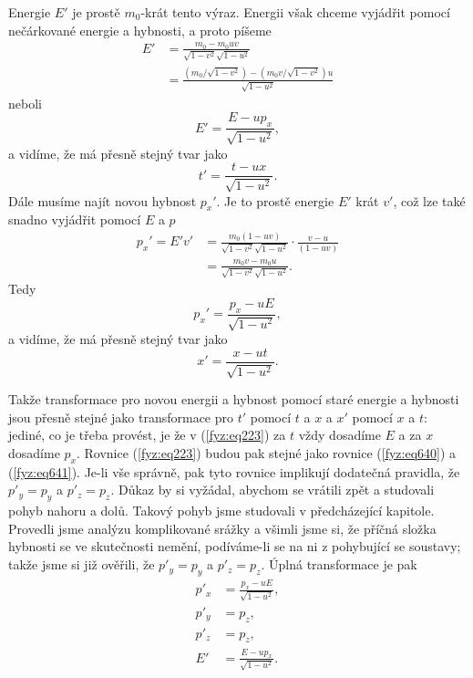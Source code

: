     Energie \(E'\) je prostě \(m_0\)-krát tento výraz. Energii však chceme vyjádřit pomocí
    nečárkované energie a hybnosti, a proto píšeme
    \begin{align*}
      E' &= \frac{m_0−m_0uv}{\sqrt{1−v^2}\sqrt{1−u^2}}  \\
         &= \frac{(m_0/\sqrt{1−v^2}) - (m_0v/\sqrt{1-v^2})u}{\sqrt{1-u^2}}
    \end{align*}
    neboli
    \begin{equation}\label{fyz:eq640}
      E' = \frac{E−up_x}{\sqrt{1-u^2}},
    \end{equation}
    a vidíme, že má přesně stejný tvar jako
    \begin{equation*}
      t' = \frac{t−ux}{\sqrt{1-u^2}}.
    \end{equation*}
    Dále musíme najít novou hybnost \(p_x'\). Je to prostě energie \(E'\) krát \(v'\), což lze také
    snadno vyjádřit pomocí \(E\) a \(p\)
    \begin{align*}
      p_x' = E'v' &= \frac{m_0(1−uv)}{\sqrt{1-v^2}\sqrt{1-u^2}}\cdot \frac{v−u}{(1−uv)}  \\
                  &= \frac{m_0v−m_0u}{\sqrt{1-v^2}\sqrt{1-u^2}}.
    \end{align*}   
    Tedy
    \begin{equation}\label{fyz:eq641}
      p_x' = \frac{p_x - uE}{\sqrt{1-u^2}},
    \end{equation}
    a vidíme, že má přesně stejný tvar jako
    \begin{equation*}
      x' = \frac{x - ut}{\sqrt{1-u^2}}.
    \end{equation*}

    Takže transformace pro novou energii a hybnost pomocí staré energie a hybnosti jsou přesně
    stejné jako transformace pro \(t'\) pomocí \(t\) a \(x\) a \(x'\) pomocí \(x\) a \(t\): jediné,
    co je třeba provést, je že v (\ref{fyz:eq223}) za \(t\) vždy dosadíme \(E\) a za \(x\) dosadíme
    \(p_x\). Rovnice (\ref{fyz:eq223}) budou pak stejné jako rovnice (\ref{fyz:eq640}) a
    (\ref{fyz:eq641}). Je-li vše správně, pak tyto rovnice implikují dodatečná pravidla, že
    \(p′_y=p_y\) a \(p′_z=p_z\). Důkaz by si vyžádal, abychom se vrátili zpět a studovali pohyb
    nahoru a dolů. Takový pohyb jsme studovali v předcházející kapitole. Provedli jsme analýzu
    komplikované srážky a všimli jsme si, že příčná složka hybnosti se ve skutečnosti nemění,
    podíváme-li se na ni z pohybující se soustavy; takže jsme si již ověřili, že \(p′_y=p_y\) a
    \(p′_z=p_z\). Úplná transformace je pak
    \begin{subequations}\label{fyz:eq642}
      \begin{align}
        p'_x &=\frac{p_x - uE}{\sqrt{1-u^2}}, \label{fyz:eq642a}   \\
        p'_y &=p_z,                           \label{fyz:eq642b}   \\
        p'_z &=p_z,                           \label{fyz:eq642c}   \\
        E'   &= \frac{E−up_x}{\sqrt{1-u^2}}.  \label{fyz:eq642d}
      \end{align}
    \end{subequations} 

